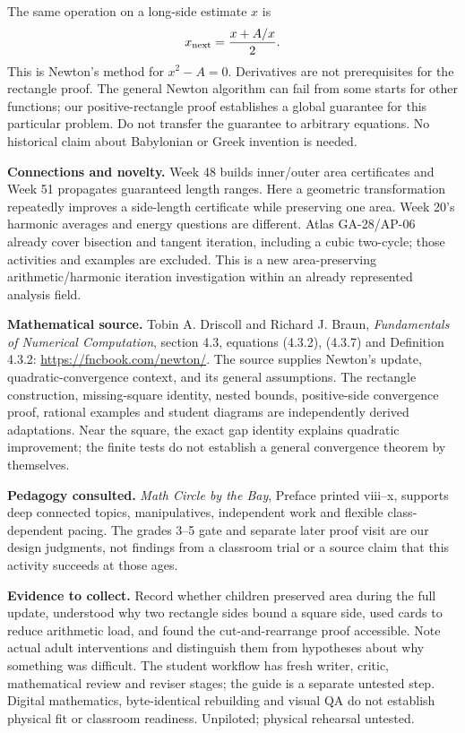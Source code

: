 \documentclass[11pt,letterpaper]{article}
\begin{document}
The same operation on a long-side estimate $x$ is
\[x_{\rm next}=\frac{x+A/x}{2}.\]
This is Newton's method for $x^2-A=0$. Derivatives are not prerequisites for the rectangle proof. The general Newton algorithm can fail from some starts for other functions; our positive-rectangle proof establishes a global guarantee for this particular problem. Do not transfer the guarantee to arbitrary equations. No historical claim about Babylonian or Greek invention is needed.

\textbf{Connections and novelty.} Week 48 builds inner/outer area certificates and Week 51 propagates guaranteed length ranges. Here a geometric transformation repeatedly improves a side-length certificate while preserving one area. Week 20's harmonic averages and energy questions are different. Atlas GA-28/AP-06 already cover bisection and tangent iteration, including a cubic two-cycle; those activities and examples are excluded. This is a new area-preserving arithmetic/harmonic iteration investigation within an already represented analysis field.

\textbf{Mathematical source.} Tobin A. Driscoll and Richard J. Braun, \emph{Fundamentals of Numerical Computation}, section 4.3, equations (4.3.2), (4.3.7) and Definition 4.3.2:
\url{https://fncbook.com/newton/}.
The source supplies Newton's update, quadratic-convergence context, and its general assumptions. The rectangle construction, missing-square identity, nested bounds, positive-side convergence proof, rational examples and student diagrams are independently derived adaptations. Near the square, the exact gap identity explains quadratic improvement; the finite tests do not establish a general convergence theorem by themselves.

\textbf{Pedagogy consulted.} \emph{Math Circle by the Bay}, Preface printed viii--x, supports deep connected topics, manipulatives, independent work and flexible class-dependent pacing. The grades 3--5 gate and separate later proof visit are our design judgments, not findings from a classroom trial or a source claim that this activity succeeds at those ages.

\textbf{Evidence to collect.} Record whether children preserved area during the full update, understood why two rectangle sides bound a square side, used cards to reduce arithmetic load, and found the cut-and-rearrange proof accessible. Note actual adult interventions and distinguish them from hypotheses about why something was difficult. The student workflow has fresh writer, critic, mathematical review and reviser stages; the guide is a separate untested step. Digital mathematics, byte-identical rebuilding and visual QA do not establish physical fit or classroom readiness. Unpiloted; physical rehearsal untested.
\end{document}
